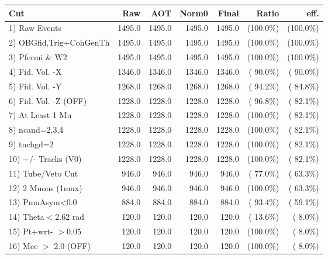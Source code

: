  \begin{table}[h!]\centering
 \begin{tabular}{||l||r|r|r|r|r|r||}
 \hline
 \hline
 Cut & Raw & AOT & Norm0 & Final & Ratio & eff.       \\
 \hline
  1) Raw Events           &       1495.0 &       1495.0 &       1495.0 &       1495.0 & (100.0\%) & (100.0\%) \\
  2) OBGfid,Trig+CohGenTh &       1495.0 &       1495.0 &       1495.0 &       1495.0 & (100.0\%) & (100.0\%) \\
  3) Pfermi \& W2         &       1495.0 &       1495.0 &       1495.0 &       1495.0 & (100.0\%) & (100.0\%) \\
  4) Fid. Vol. -X         &       1346.0 &       1346.0 &       1346.0 &       1346.0 & ( 90.0\%) & ( 90.0\%) \\
  5) Fid. Vol. -Y         &       1268.0 &       1268.0 &       1268.0 &       1268.0 & ( 94.2\%) & ( 84.8\%) \\
  6) Fid. Vol. -Z (OFF)   &       1228.0 &       1228.0 &       1228.0 &       1228.0 & ( 96.8\%) & ( 82.1\%) \\
  7) At Least 1 Mu        &       1228.0 &       1228.0 &       1228.0 &       1228.0 & (100.0\%) & ( 82.1\%) \\
  8) ncand=2,3,4          &       1228.0 &       1228.0 &       1228.0 &       1228.0 & (100.0\%) & ( 82.1\%) \\
  9) tnchgd=2             &       1228.0 &       1228.0 &       1228.0 &       1228.0 & (100.0\%) & ( 82.1\%) \\
 10) +/- Tracks (V0)      &       1228.0 &       1228.0 &       1228.0 &       1228.0 & (100.0\%) & ( 82.1\%) \\
 11) Tube/Veto Cut        &        946.0 &        946.0 &        946.0 &        946.0 & ( 77.0\%) & ( 63.3\%) \\
 12) 2 Muons (1mux)       &        946.0 &        946.0 &        946.0 &        946.0 & (100.0\%) & ( 63.3\%) \\
 13) PmuAsym<0.0          &        884.0 &        884.0 &        884.0 &        884.0 & ( 93.4\%) & ( 59.1\%) \\
 14) Theta$<$2.62 rad     &        120.0 &        120.0 &        120.0 &        120.0 & ( 13.6\%) & (  8.0\%) \\
 15) Pt+wrt- $>$0.05      &        120.0 &        120.0 &        120.0 &        120.0 & (100.0\%) & (  8.0\%) \\
 16) Mee $>$ 2.0  (OFF)   &        120.0 &        120.0 &        120.0 &        120.0 & (100.0\%) & (  8.0\%) \\

\end{tabular}
\end{table}
